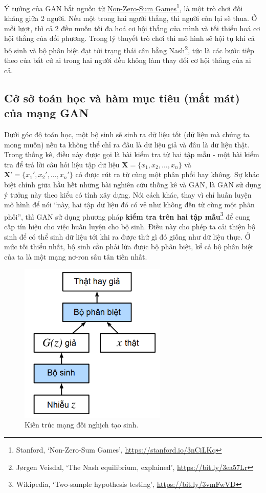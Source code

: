 \documentclass[a4paper, 12pt]{report}
\begin{document}
Ý tưởng của GAN bắt nguồn từ \href{https://cs.stanford.edu/people/eroberts/courses/soco/projects/1998-99/game-theory/nonzero.html}{Non-Zero-Sum Games}\footnote{Stanford, \lq Non-Zero-Sum Games\rq, \href{https://stanford.io/3nCiLKq}{https://stanford.io/3nCiLKq}}, là một trò chơi đối kháng giữa 2 người.
Nếu một trong hai người thắng, thì người còn lại sẽ thua.
Ở mỗi lượt, thì cả 2 đều muốn tối đa hoá cơ hội thắng của mình và tối thiểu hoá cơ hội thắng của đối phương.
Trong lý thuyết trò chơi thì mô hình sẽ hội tụ khi cả bộ sinh và bộ phân biệt đạt tới trạng thái cân bằng Nash\footnote{Jørgen Veisdal, \lq The Nash equilibrium, explained\rq, \href{https://bit.ly/3ea57Lr}{https://bit.ly/3ea57Lr}}, tức là các bước tiếp theo của bất cứ ai trong hai người đều không làm thay đổi cơ hội thẳng của ai cả.

\subsection{Cở sở toán học và hàm mục tiêu (mất mát) của mạng GAN}

Dưới góc độ toán học, một bộ sinh sẽ sinh ra dữ liệu tốt (dữ liệu mà chúng ta mong muốn) nếu ta không thể chỉ ra đâu là dữ liệu giả và đâu là dữ liệu thật.
Trong thống kê, điều này được gọi là bài kiểm tra từ hai tập mẫu - một bài kiểm tra để trả lời câu hỏi liệu tập dữ liệu $\bm{X} = \{x_1, x_2, \dots, x_n\}$ và $\bm{X'}=\{x_1', x_2', \dots, x_n'\}$ có được rút ra từ cùng một phân phối hay không.
Sự khác biệt chính giữa hầu hết những bài nghiên cứu thống kê và GAN, là GAN sử dụng ý tưởng này theo kiểu có tính xây dựng.
Nói cách khác, thay vì chỉ huấn luyện mô hình để nói ``này, hai tập dữ liệu đó có vẻ như không đến từ cùng một phân phối'', thì GAN sử dụng phương pháp \textbf{kiểm tra trên hai tập mẫu}\footnote{Wikipedia, \lq Two-sample hypothesis testing\rq, \href{https://bit.ly/3vmFwVD}{https://bit.ly/3vmFwVD}} để cung cấp tín hiệu cho việc huấn luyện cho bộ sinh.
Điều này cho phép ta cải thiện bộ sinh để có thể sinh dữ liệu tới khi ra được thứ gì đó giống như dữ liệu thực.
Ở mức tối thiểu nhất, bộ sinh cần phải lừa được bộ phân biệt, kể cả bộ phân biệt của ta là một mạng nơ-ron sâu tân tiên nhất.

\begin{figure}[!h]
\captionsetup{width=0.8\textwidth}
\centering
\includegraphics[width=7cm]{images/2_71.PNG}
\caption{Kiến trúc mạng đối nghịch tạo sinh.}
\label{fig:architectsimplegan}
\end{figure}
\end{document}

